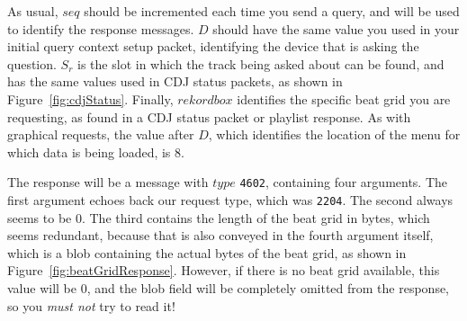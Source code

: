 \documentclass[11pt]{article}
\begin{document}
As usual, $seq$ should be incremented each time you send a query, and
will be used to identify the response messages. $D$ should have the
same value you used in your initial query context setup packet,
identifying the device that is asking the question. $S_r$ is the slot
in which the track being asked about can be found, and has the same
values used in CDJ status packets, as shown in
Figure~\ref{fig:cdjStatus}. Finally, $rekordbox$ identifies the
specific beat grid you are requesting, as found in a CDJ status
packet or playlist response. As with graphical requests, the value
after $D$, which identifies the location of the menu for which data is
being loaded, is 8.

The response will be a message with $type$ {\tt 4602}, containing four
arguments. The first argument echoes back our request type, which was
{\tt 2204}. The second always seems to be 0. The third contains the
length of the beat grid in bytes, which seems redundant, because that
is also conveyed in the fourth argument itself, which is a blob
containing the actual bytes of the beat grid, as shown in
Figure~\ref{fig:beatGridResponse}. However, if there is no beat grid
available, this value will be 0, and the blob field will be completely
omitted from the response, so you \emph{must not} try to read it!
\end{document}
